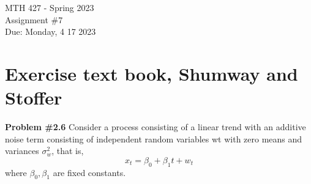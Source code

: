 \documentclass[12pt]{article}
\newcommand{\nnl}{\vspace{0.2in}\noindent}
\begin{document}
\pagestyle{fancy}
\fancyhf{}

\noindent MTH 427 - Spring 2023
\\Assignment \#7
\\Due: Monday, 4 17 2023

\section{Exercise text book, Shumway and Stoffer}

\nnl\textbf{Problem \#2.6}
Consider a process consisting of a linear trend with an additive noise term
consisting of independent random variables wt with zero means and variances
$\sigma_w^2$, that is,
$$x_t = \beta_0 + \beta_1 t + w_t$$
where $\beta_0, \beta_1$ are fixed constants.
\end{document}
